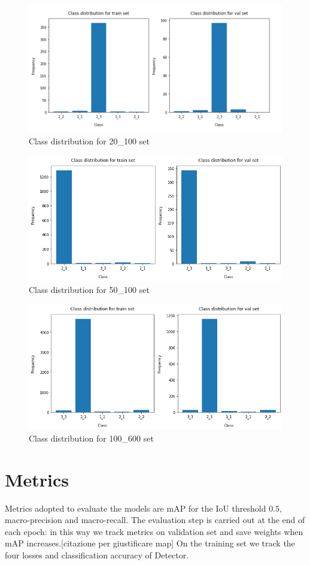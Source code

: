 \documentclass[a4paper,10pt]{report}
\begin{document}
\begin{figure}[h]
  \center
  \includegraphics[width=0.65\linewidth]{20_100.png}
  \caption{Class distribution for 20_100 set}
  \label{fig:20_100}
\end{figure}
\begin{figure}[h]
  \center
  \includegraphics[width=0.65\linewidth]{50_100.png}
  \caption{Class distribution for 50_100 set}
  \label{fig:50_100}
\end{figure}
\begin{figure}[h]
  \center
  \includegraphics[width=0.65\linewidth]{100_600.png}
  \caption{Class distribution for 100_600 set}
  \label{fig:100_600}
\end{figure}

\section{Metrics}
Metrics adopted to evaluate the models are mAP for the IoU threshold $0.5$, macro-precision and macro-recall.
The evaluation step is carried out at the end of each epoch: in this way we track metrics on validation set and save weights when mAP increases.[citazione per giustificare map]
On the training set we track the four losses and classification accuracy of Detector.
\end{document}
